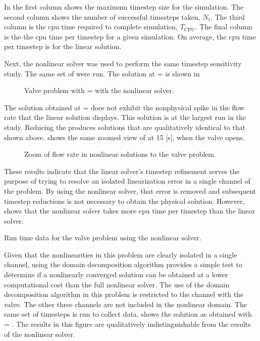 In  the first column shows the maximum timestep size for the simulation.
The second column shows the number of successful timesteps taken, $N_{t}$.
The third column is the cpu time required to complete simulation, $T_{\text{CPU}}$.
The final column is the the cpu time per timestep for a given simulation.
On average, the cpu time per timestep is  for the linear solution.

Next, the nonlinear solver was used to perform the same timestep sensitivity study.
The same set of \dtmax{} were run.
The solution at \dtmax{} =  is shown in 

\begin{figure}[h!t]
\centering

\caption{Valve problem with \dtmax{} =  with the nonlinear solver.}
\label{fig:valveNln6pt25em02}
\end{figure}

The solution obtained at \dtmax{} =  does not exhibit the nonphysical spike in the flow rate that the linear solution displays.
This solution is at the largest \dt{} run in the study.
Reducing the \dtmax{} produces solutions that are qualitatively identical to that shown above.
 shows the same zoomed view of at 15 [s], when the valve opens.

\begin{figure}[h!t]
\centering

\caption{Zoom of flow rate in nonlinear solutions to the valve problem.}
\label{fig:valveNlnSols}
\end{figure}

These results indicate that the linear solver's timestep refinement serves the purpose of trying to resolve an isolated linearization error in a single channel of the problem.
By using the nonlinear solver, that error is removed and subsequent timestep reductions is not necessary to obtain the physical solution.
However,  shows that the nonlinear solver takes more cpu time per timestep than the linear solver.

\begin{table}[h!t]
\centering
\singlespace

\caption{Run time data for the valve problem using the nonlinear solver.}
\label{tab:valveNlnDataTable}
\end{table}

Given that the nonlinearities in this problem are clearly isolated in a single channel, using the domain decomposition algorithm provides a simple test to determine if a nonlinearly converged solution can be obtained at a lower computational cost than the full nonlinear solver.
The use of the domain decomposition algorithm in this problem is restricted to the channel with the valve.
The other three channels are not included in the nonlinear domain.
The same set of timesteps is run to collect data.
 shows the solution as obtained with \dtmax{} = .
The results in this figure are qualitatively indistinguishable from the results of the nonlinear solver.

